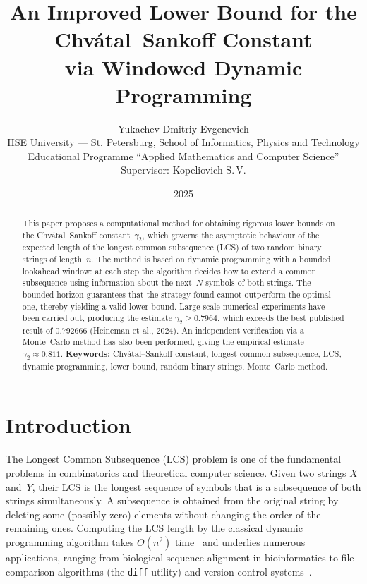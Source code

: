 \documentclass[12pt,a4paper]{article}
\title{%
  An Improved Lower Bound for the Chv\'{a}tal--Sankoff Constant\\
  via Windowed Dynamic Programming%
}
\author{%
  Yukachev Dmitriy Evgenevich\\
  \small HSE University --- St. Petersburg, School of Informatics, Physics and Technology\\
  \small Educational Programme ``Applied Mathematics and Computer Science''\\
  \small Supervisor: Kopeliovich S.\,V.%
}
\date{2025}
\begin{document}
\maketitle
\begin{abstract}
This paper proposes a computational method for obtaining rigorous lower bounds on the Chv\'{a}tal--Sankoff constant~$\gamma_2$, which governs the asymptotic behaviour of the expected length of the longest common subsequence (LCS) of two random binary strings of length~$n$.
The method is based on dynamic programming with a bounded lookahead window: at each step the algorithm decides how to extend a common subsequence using information about the next~$N$ symbols of both strings.
The bounded horizon guarantees that the strategy found cannot outperform the optimal one, thereby yielding a valid lower bound.
Large-scale numerical experiments have been carried out, producing the estimate $\gamma_2 \geq 0.7964$, which exceeds the best published result of $0.792666$ (Heineman et al., 2024).
An independent verification via a Monte~Carlo method has also been performed, giving the empirical estimate $\gamma_2 \approx 0.811$.
\medskip\noindent
\textbf{Keywords:} Chv\'{a}tal--Sankoff constant, longest common subsequence, LCS, dynamic programming, lower bound, random binary strings, Monte~Carlo method.
\end{abstract}
\section{Introduction}
The Longest Common Subsequence (LCS) problem is one of the fundamental problems in combinatorics and theoretical computer science.
Given two strings $X$ and~$Y$, their LCS is the longest sequence of symbols that is a subsequence of both strings simultaneously.
A subsequence is obtained from the original string by deleting some (possibly zero) elements without changing the order of the remaining ones.
Computing the LCS length by the classical dynamic programming algorithm takes $O(n^2)$ time~\cite{hirschberg1977} and underlies numerous applications, ranging from biological sequence alignment in bioinformatics to file comparison algorithms (the \texttt{diff} utility) and version control systems~\cite{chvatal1975}.
\end{document}
